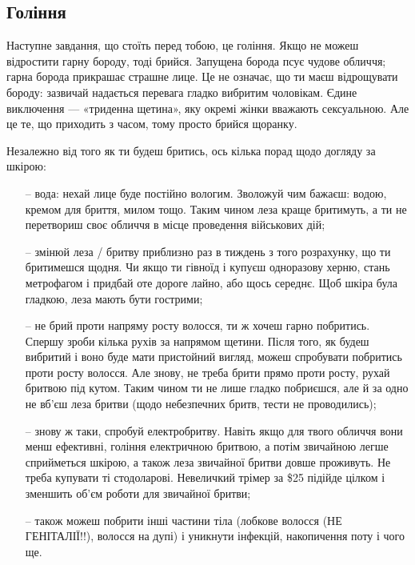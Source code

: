 \subsection{Гоління}
Наступне завдання, що стоїть перед тобою, це гоління. Якщо не можеш відростити
гарну бороду, тоді брийся. Запущена борода псує чудове обличчя; гарна борода
прикрашає страшне лице. Це не означає, що ти маєш відрощувати бороду: зазвичай
надається перевага гладко вибритим чоловікам. Єдине виключення — «триденна
щетина», яку окремі жінки вважають сексуальною. Але це те, що приходить з
часом, тому просто брийся щоранку.

Незалежно від того як ти будеш бритись, ось кілька порад щодо догляду за
шкірою:
\begin{itemize}
	\item[--] вода: нехай лице буде постійно вологим. Зволожуй чим бажаєш:
	водою, кремом для бриття, милом тощо. Таким чином леза краще бритимуть, а
	ти не перетвориш своє обличчя в місце проведення військових дій;
	\item[--] змінюй леза / бритву приблизно раз в тиждень з того розрахунку,
	що ти бритимешся щодня. Чи якщо ти гівноїд і купуєш одноразову херню,
	стань метрофагом і придбай оте дороге лайно, або щось середнє. Щоб шкіра
	була гладкою, леза мають бути гострими;
	\item[--] не брий проти напряму росту волосся, ти ж хочеш гарно побритись.
	Спершу зроби кілька рухів за напрямом щетини. Після того, як будеш вибритий
	і воно буде мати пристойний вигляд, можеш спробувати побритись проти росту
	волосся. Але знову, не треба брити прямо проти росту, рухай бритвою під
	кутом. Таким чином ти не лише гладко побриєшся, але й за одно не вб’єш леза
	бритви (щодо небезпечних бритв, тести не проводились);
	\item[--] знову ж таки, спробуй електробритву. Навіть якщо для твого
	обличчя вони менш ефективні, гоління електричною бритвою, а потім звичайною
	легше сприйметься шкірою, а також леза звичайної бритви довше проживуть.
	Не треба купувати ті стодоларові. Невеличкий трімер за \$25 підійде цілком
	і зменшить об’єм роботи для звичайної бритви;
	\item[--] також можеш побрити інші частини тіла (лобкове волосся (НЕ
	ГЕНІТАЛІЇ!!), волосся на дупі) і уникнути інфекцій, накопичення поту і
	чого ще.
\end{itemize}

